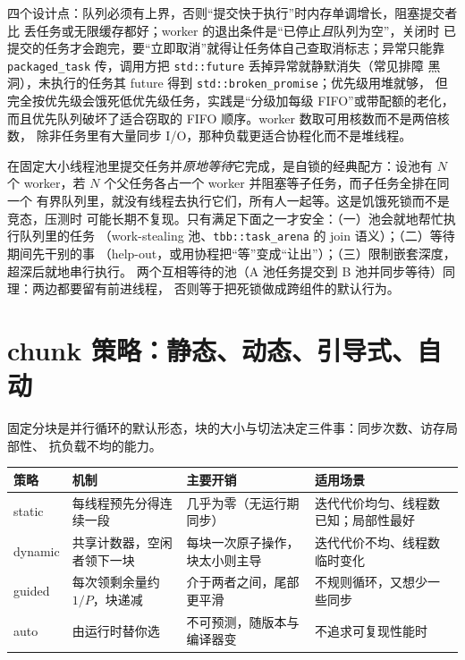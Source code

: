\documentclass[12pt,a4paper,fontset=fandol]{ctexbook}
\newcommand{\Tp}[1]{\texttt{#1}}
\begin{document}
四个设计点：队列必须有上界，否则``提交快于执行''时内存单调增长，阻塞提交者比
丢任务或无限缓存都好；worker 的退出条件是``已停止\emph{且}队列为空''，关闭时
已提交的任务才会跑完，要``立即取消''就得让任务体自己查取消标志；异常只能靠
\Tp{packaged\_task} 传，调用方把 \Tp{std::future} 丢掉异常就静默消失（常见排障
黑洞），未执行的任务其 future 得到 \Tp{std::broken\_promise}；优先级用堆就够，
但完全按优先级会饿死低优先级任务，实践是``分级加每级 FIFO''或带配额的老化，
而且优先队列破坏了适合窃取的 FIFO 顺序。worker 数取可用核数而不是两倍核数，
除非任务里有大量同步 I/O，那种负载更适合协程化而不是堆线程。

\begin{warning}[title={嵌套提交导致的自锁与饥饿死锁}]
在固定大小线程池里提交任务并\emph{原地等待}它完成，是自锁的经典配方：设池有 $N$
个 worker，若 $N$ 个父任务各占一个 worker 并阻塞等子任务，而子任务全排在同一个
有界队列里，就没有线程去执行它们，所有人一起等。这是饥饿死锁而不是竞态，压测时
可能长期不复现。只有满足下面之一才安全：（一）池会就地帮忙执行队列里的任务
（work-stealing 池、\Tp{tbb::task\_arena} 的 join 语义）；（二）等待期间先干别的事
（help-out，或用协程把``等''变成``让出''）；（三）限制嵌套深度，超深后就地串行执行。
两个互相等待的池（A 池任务提交到 B 池并同步等待）同理：两边都要留有前进线程，
否则等于把死锁做成跨组件的默认行为。
\end{warning}

\section{chunk 策略：静态、动态、引导式、自动}

固定分块是并行循环的默认形态，块的大小与切法决定三件事：同步次数、访存局部性、
抗负载不均的能力。
\begin{compare}[title={四种 chunk 策略的适用面与开销}]
\begin{tabular}{@{}>{\raggedright\arraybackslash}p{}
  >{\raggedright\arraybackslash}p{}
  >{\raggedright\arraybackslash}p{}
  >{\raggedright\arraybackslash}p{}@{}}
\toprule
策略 & 机制 & 主要开销 & 适用场景 \\
\midrule
static & 每线程预先分得连续一段 & 几乎为零（无运行期同步） & 迭代代价均匀、线程数已知；局部性最好 \\
dynamic & 共享计数器，空闲者领下一块 & 每块一次原子操作，块太小则主导 & 迭代代价不均、线程数临时变化 \\
guided & 每次领剩余量约 $1/P$，块递减 & 介于两者之间，尾部更平滑 & 不规则循环，又想少一些同步 \\
auto & 由运行时替你选 & 不可预测，随版本与编译器变 & 不追求可复现性能时 \\
\bottomrule
\end{tabular}
\end{compare}
\end{document}
